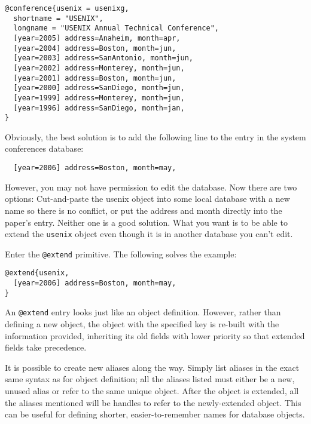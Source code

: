 \documentclass{article}
\begin{document}
\begin{small}\begin{verbatim}
@conference{usenix = usenixg,
  shortname = "USENIX",
  longname = "USENIX Annual Technical Conference",
  [year=2005] address=Anaheim, month=apr,
  [year=2004] address=Boston, month=jun,
  [year=2003] address=SanAntonio, month=jun,
  [year=2002] address=Monterey, month=jun,
  [year=2001] address=Boston, month=jun,
  [year=2000] address=SanDiego, month=jun,
  [year=1999] address=Monterey, month=jun,
  [year=1996] address=SanDiego, month=jan,
}
\end{verbatim}\end{small}

Obviously, the best solution is to add the following line to the entry
in the system conferences database:

\begin{small}\begin{verbatim}
  [year=2006] address=Boston, month=may,
\end{verbatim}\end{small}

However, you may not have permission to edit the database.  Now there are
two options: Cut-and-paste the usenix object into some local database with
a new name so there is no conflict, or put the address and month directly
into the paper's entry.  Neither one is a good solution.  What you want is
to be able to extend the \texttt{usenix} object even though it is in
another database you can't edit.

Enter the \texttt{@extend} primitive.  The following solves the example:

\begin{small}\begin{verbatim}
@extend{usenix,
  [year=2006] address=Boston, month=may,
}
\end{verbatim}\end{small}

An \texttt{@extend} entry looks just like an object definition.  However,
rather than defining a new object, the object with the specified key is
re-built with the information provided, inheriting its old fields with
lower priority so that extended fields take precedence.

It is possible to create new aliases along the way.  Simply list aliases
in the exact same syntax as for object definition; all the aliases listed
must either be a new, unused alias or refer to the same unique object.
After the object is extended, all the aliases mentioned will be handles
to refer to the newly-extended object.  This can be useful for defining
shorter, easier-to-remember names for database objects.
\end{document}
